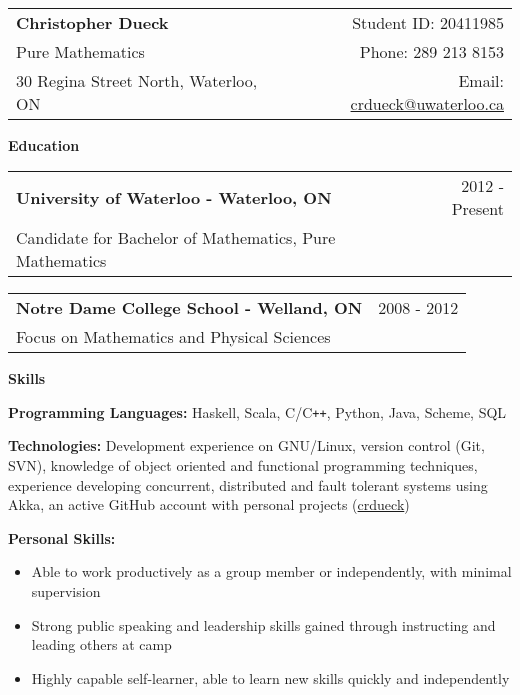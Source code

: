 \documentclass[10pt]{article}
\makeatletter
\newcommand{\resheader}[6]{\
\begin{tabular*}{7in}{l@{\extracolsep{\fill}}r}
    \textbf{\huge #1} & {\large #2} \vspace{4pt}\\
    {\large #3} & {\large #4} \vspace{4pt}\\
    {\large #5} & {\large #6}
\end{tabular*}\vspace{4pt}}
\newcommand{\resheading}[1]{{\large \colorbox{headercol}{\begin{minipage}{\textwidth}{\textbf{#1 \vphantom{p\^{E}}}}\end{minipage}}}}
\newcommand{\ressubheading}[3]{\item
\begin{tabular*}{7in}{l@{\extracolsep{\fill}}r}
    \textbf{#1} & #2 \\ #3
\end{tabular*}\vspace{-4pt}}
\newcommand{\resitem}[2]{\item{\textbf{#1} #2}}
\makeatother
\begin{document}
\resheader{Christopher Dueck} {Student ID: 20411985}
{Pure Mathematics} {Phone: 289 213 8153}
{30 Regina Street North, Waterloo, ON} {Email: \href{mailto:crdueck@uwaterloo.ca}{crdueck@uwaterloo.ca}}

\resheading{Education}
\begin{description}
    \ressubheading{University of Waterloo - Waterloo, ON} {2012 - Present} {Candidate for Bachelor of Mathematics, Pure Mathematics}
    \ressubheading{Notre Dame College School - Welland, ON} {2008 - 2012} {Focus on Mathematics and Physical Sciences}
\end{description}

\resheading{Skills}
\begin{description}
    \resitem{Programming Languages:} {Haskell, Scala, C/C\texttt{++}, Python, Java, Scheme, SQL}
    \resitem{Technologies:} {Development experience on GNU/Linux, version control (Git, SVN), knowledge of object oriented and functional programming techniques, experience developing concurrent, distributed and fault tolerant systems using Akka, an active GitHub account with personal projects (\href{https://github.com/crdueck}{crdueck})}
    \resitem{Personal Skills:}{\vspace{-4pt}
    \begin{itemize}
        \item{Able to work productively as a group member or independently, with minimal supervision}
        \item{Strong public speaking and leadership skills gained through instructing and leading others at camp}
        \item{Highly capable self-learner, able to learn new skills quickly and independently}
    \end{itemize}}
\end{description}
\end{document}
